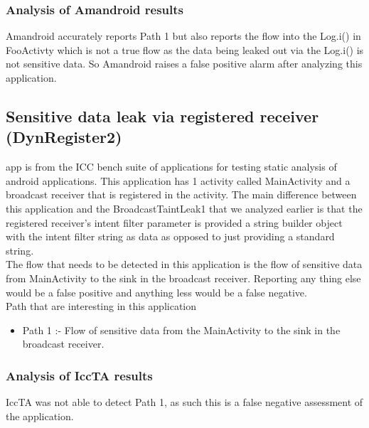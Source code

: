 \documentclass[journal]{IEEEtran}
\begin{document}
\subsubsection{Analysis of Amandroid results}
Amandroid accurately reports  Path 1 but also reports the flow into the  Log.i() in FooActivty which is not a true flow as the data being leaked out via the Log.i() is not sensitive data. So Amandroid raises a false positive alarm after analyzing this application.


\subsection{Sensitive data leak via registered receiver  (DynRegister2)}
% 
% 
% 
% 
 app is from the ICC bench suite of applications for testing static analysis of android applications. This application has 1 activity called MainActivity and a broadcast receiver that is registered in the activity. The main difference between this application and the BroadcastTaintLeak1 that we analyzed earlier is that the registered receiver's intent filter parameter is provided a string builder object with the intent filter string as data as opposed to just providing a standard string.\\
The flow that needs to be detected in this application is the flow of sensitive data from MainActivity to the sink in the broadcast receiver. Reporting any thing else would be a false positive and anything less would be a false negative.\\
Path that are interesting in this application
\begin{itemize}
	\item Path 1 :-  Flow of sensitive data from the MainActivity to the sink in the broadcast receiver.
\end{itemize}

\subsubsection{Analysis of IccTA results}
IccTA was not able to detect Path 1, as such this is a false negative assessment of the application. 
\end{document}
